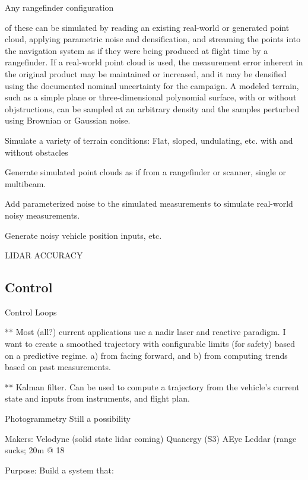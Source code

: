 \documentclass[10pt,a4paper]{report}
\begin{document}
Any rangefinder configuration

of these can be simulated by reading an existing real-world or generated point cloud, applying parametric noise and densification, and streaming the points into the navigation system as if they were being produced at flight time by a rangefinder. If a real-world point cloud is used, the measurement error inherent in the original product may be maintained or increased, and it may be densified using the documented nominal uncertainty for the campaign. A modeled terrain, such as a simple plane or three-dimensional polynomial surface, with or without objstructions, can be sampled at an arbitrary density and the samples perturbed using Brownian or Gaussian noise.

Simulate a variety of terrain conditions: Flat, sloped, undulating, etc. with and without obstacles

Generate simulated point clouds as if from a rangefinder or scanner, single or multibeam.

Add parameterized noise to the simulated measurements to simulate real-world noisy measurements.

Generate noisy vehicle position inputs, etc.

LIDAR ACCURACY \cite{May2007}




\subsection{Control}

Control Loops








** Most (all?) current applications use a nadir laser and reactive paradigm. I want to create a smoothed trajectory with configurable limits (for safety) based on a predictive regime. a) from facing forward, and b) from computing trends based on past measurements.

** Kalman filter. Can be used to compute a trajectory from the vehicle’s current state and inputs from instruments, and flight plan. 



Photogrammetry
Still a possibility

Makers:
Velodyne (solid state lidar coming)
Quanergy (S3)
AEye
Leddar (range sucks; 20m @ 18%

Purpose: Build a system that:
\end{document}

